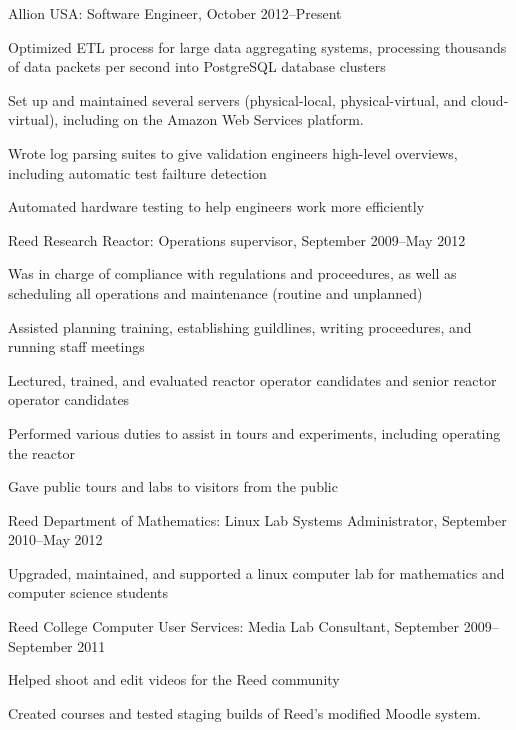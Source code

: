 \documentclass[letterpaper]{article}
\renewenvironment{itemize}{\begin{list}{}{\setlength{\leftmargin}{1.5em}}}{\end{list}}%
\begin{document}
\begin{itemize}
\item Allion USA: Software Engineer, October 2012--Present
	\begin{itemize}
	\item Optimized ETL process for large data aggregating systems, processing thousands of data packets per second into PostgreSQL database clusters
	\item Set up and maintained several servers (physical-local, physical-virtual, and cloud-virtual), including on the Amazon Web Services platform.
	\item Wrote log parsing suites to give validation engineers high-level overviews, including automatic test failture detection
	\item Automated hardware testing to help engineers work more efficiently 
	\end{itemize}
\item Reed Research Reactor: Operations supervisor, September 2009--May 2012
	\begin{itemize}
	\item Was in charge of compliance with regulations and proceedures, as well as scheduling all operations and maintenance (routine and unplanned)
	\item Assisted planning training, establishing guildlines, writing proceedures, and running staff meetings
	\item Lectured, trained, and evaluated reactor operator candidates and senior reactor operator candidates
	\item Performed various duties to assist in tours and experiments, including operating the reactor
	\item Gave public tours and labs to visitors from the public
	\end{itemize}
\item Reed Department of Mathematics: Linux Lab Systems Administrator, September 2010--May 2012
	\begin{itemize}
	\item Upgraded, maintained, and supported a linux computer lab for mathematics and computer science students
	\end{itemize}
\item Reed College Computer User Services: Media Lab Consultant, September 2009--September 2011
	\begin{itemize}
	\item Helped shoot and edit videos for the Reed community
	\item Created courses and tested staging builds of Reed's modified Moodle system. 

\end{itemize}
\end{itemize}
\end{document}

